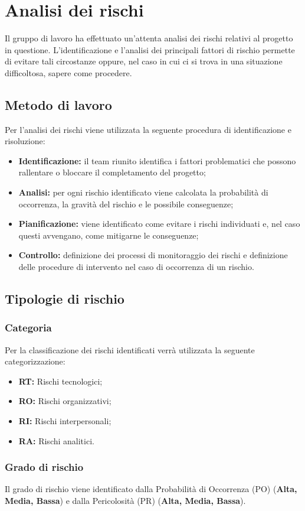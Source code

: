 \section{Analisi dei rischi}
Il gruppo di lavoro ha effettuato un'attenta analisi dei rischi relativi al progetto in questione. L'identificazione e l'analisi dei principali fattori di rischio permette di evitare tali circostanze oppure, nel caso in cui ci si trova in una situazione difficoltosa, sapere come procedere.
\subsection{Metodo di lavoro}
Per l'analisi dei rischi viene utilizzata la seguente procedura di identificazione e risoluzione:
\begin{itemize}
	\item \textbf{Identificazione:} il team riunito identifica i fattori problematici che possono rallentare o bloccare il completamento del progetto;
	\item \textbf{Analisi:} per ogni rischio identificato viene calcolata la probabilità di occorrenza, la gravità del rischio e le possibile conseguenze;
	\item \textbf{Pianificazione:} viene identificato come evitare i rischi individuati e, nel caso questi avvengano, come mitigarne le conseguenze;
	\item \textbf{Controllo:} definizione dei processi di monitoraggio dei rischi e definizione delle procedure di intervento nel caso di occorrenza di un rischio.
\end{itemize}
\subsection{Tipologie di rischio}
\subsubsection{Categoria}
Per la classificazione dei rischi identificati verrà utilizzata la seguente categorizzazione:
\begin{itemize}
	\item \textbf{RT:} Rischi tecnologici;
	\item \textbf{RO:} Rischi organizzativi;
	\item \textbf{RI:} Rischi interpersonali;
	\item \textbf{RA:} Rischi analitici.
\end{itemize}
\subsubsection{Grado di rischio}
Il grado di rischio viene identificato dalla Probabilità di Occorrenza (PO) (\textbf{Alta, Media, Bassa}) e dalla Pericolosità (PR) (\textbf{Alta, Media, Bassa}).
